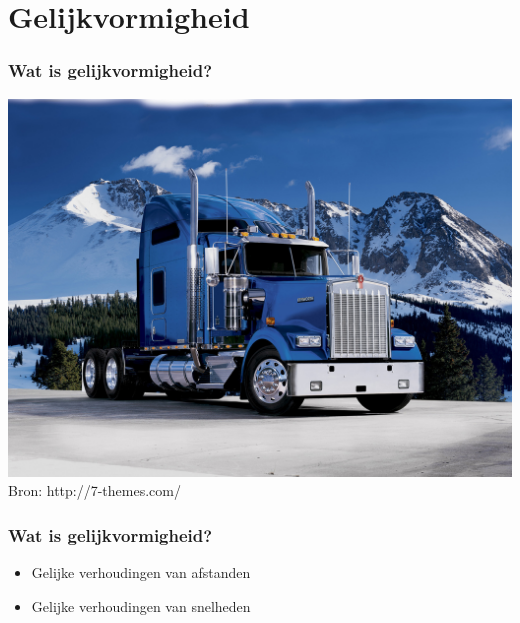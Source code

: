 \documentclass[t]{beamer}
\begin{document}
	\section{Gelijkvormigheid}	
  	\begin{frame}
		\frametitle{Wat is gelijkvormigheid?}

		\centering
		\includegraphics[height=0.8\textheight]{fig/gelijkvormigheid/6931636-kenworth-w900-wallpaper-hd.jpg}\\
		\footnotesize{Bron: http://7-themes.com/}
  	\end{frame}
  	\begin{frame}
		\frametitle{Wat is gelijkvormigheid?}
		
		\begin{itemize}
			\item<2-3> Gelijke verhoudingen van afstanden
			\item<3-3> Gelijke verhoudingen van snelheden
		\end{itemize}

        \vspace{0.1cm}
               
		
  	\end{frame}
\end{document}
